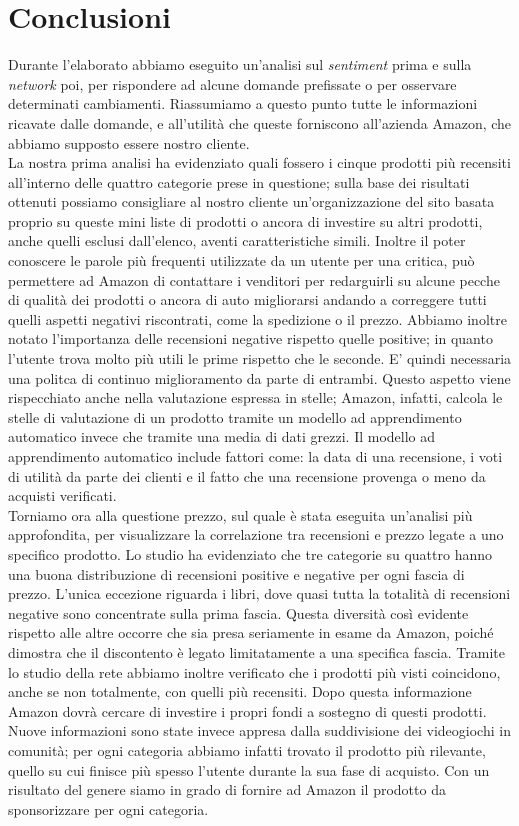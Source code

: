\chapter{Conclusioni}
	Durante l'elaborato abbiamo eseguito un'analisi sul \textit{sentiment} prima e sulla \textit{network} poi, per rispondere ad alcune domande prefissate o per osservare determinati cambiamenti. Riassumiamo a questo punto tutte le informazioni ricavate dalle domande, e all'utilità che queste forniscono all'azienda Amazon, che abbiamo supposto essere nostro cliente. \\	
	La nostra prima analisi ha evidenziato quali fossero i cinque prodotti più recensiti all'interno delle quattro categorie prese in questione; sulla base dei risultati ottenuti possiamo consigliare al nostro cliente un'organizzazione del sito basata proprio su queste mini liste di prodotti o ancora di investire su altri prodotti, anche quelli esclusi dall'elenco, aventi caratteristiche simili. Inoltre il poter conoscere le parole più frequenti utilizzate da un utente per una critica, può permettere ad Amazon di contattare i venditori per redarguirli su alcune pecche di qualità dei prodotti o ancora di auto migliorarsi andando a correggere tutti quelli aspetti negativi riscontrati, come la spedizione o il prezzo. Abbiamo inoltre notato l'importanza delle recensioni negative rispetto quelle positive; in quanto l'utente trova molto più utili le prime rispetto che le seconde. E' quindi necessaria una politca di continuo miglioramento da parte di entrambi. Questo aspetto viene rispecchiato anche nella valutazione espressa in stelle; Amazon, infatti, calcola le stelle di valutazione di un prodotto tramite un modello ad apprendimento automatico invece che tramite una media di dati grezzi. Il modello ad apprendimento automatico include fattori come: la data di una recensione, i voti di utilità da parte dei clienti e il fatto che una recensione provenga o meno da acquisti verificati.\\
	Torniamo ora alla questione prezzo, sul quale è stata eseguita un'analisi più approfondita, per visualizzare la correlazione tra recensioni e prezzo legate a uno specifico prodotto. Lo studio ha evidenziato che tre categorie su quattro hanno una buona distribuzione di recensioni positive e negative per ogni fascia di prezzo. L'unica eccezione riguarda i libri, dove quasi tutta la totalità di recensioni negative sono concentrate sulla prima fascia. Questa diversità così evidente rispetto alle altre occorre che sia presa seriamente in esame da Amazon, poiché dimostra che il discontento è legato limitatamente a una specifica fascia. Tramite lo studio della rete abbiamo inoltre verificato che i prodotti più visti coincidono, anche se non totalmente, con quelli più recensiti. Dopo questa informazione Amazon dovrà cercare di investire i propri fondi a sostegno di questi prodotti. Nuove informazioni sono state invece appresa dalla suddivisione dei videogiochi in comunità; per ogni categoria abbiamo infatti trovato il prodotto più rilevante, quello su cui finisce più spesso l'utente durante la sua fase di acquisto. Con un risultato del genere siamo in grado di fornire ad Amazon il prodotto da sponsorizzare per ogni categoria.

